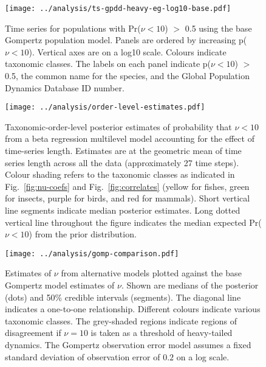 \begin{figure}[htbp]
\begin{center}
\texttt{[image: ../analysis/ts-gpdd-heavy-eg-log10-base.pdf]}
\caption{
  Time series for populations with Pr($\nu < 10$) $>$ 0.5 using the base
  Gompertz population model. Panels are ordered by increasing p($\nu < 10$).
  Vertical axes are on a log10 scale. Colours indicate taxonomic classes. The
  labels on each panel indicate p($\nu < 10$) $>$ 0.5, the common name for the
  species, and the Global Population Dynamics Database ID number.
}
\label{fig:heavy-ts}
\end{center}
\end{figure}

\clearpage

\begin{figure}[htbp]
\begin{center}
\texttt{[image: ../analysis/order-level-estimates.pdf]}
\caption{
  Taxonomic-order-level posterior estimates of probability that $\nu < 10$ from
  a beta regression multilevel model accounting for the effect of time-series
  length. Estimates are at the geometric mean of time series length across all
  the data (approximately 27 time steps). Colour shading refers to the
  taxonomic classes as indicated in Fig.~\ref{fig:nu-coefs} and
  Fig.~\ref{fig:correlates} (yellow for fishes, green for insects, purple for
  birds, and red for mammals). Short vertical line segments indicate median
  posterior estimates. Long dotted vertical line throughout the figure
  indicates the median expected Pr($\nu < 10$) from the prior distribution.
}
\label{fig:order-estimates}
\end{center}
\end{figure}

\clearpage

\begin{figure}[htbp]
\begin{center}
\texttt{[image: ../analysis/gomp-comparison.pdf]}
\caption{
  Estimates of $\nu$ from alternative models plotted against the base Gompertz
  model estimates of $\nu$. Shown are medians of the posterior (dots) and 50\%
  credible intervals (segments). The diagonal line indicates a one-to-one
  relationship. Different colours indicate various taxonomic classes. The
  grey-shaded regions indicate regions of disagreement if $\nu = 10$ is taken
  as a threshold of heavy-tailed dynamics. The Gompertz observation error model
  assumes a fixed standard deviation of observation error of $0.2$ on a log
  scale.
}
\label{fig:alt}
\end{center}
\end{figure}

